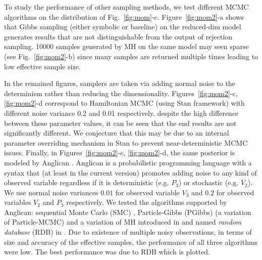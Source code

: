 \documentclass{article}
\begin{document}
To study the performance of other sampling methods, we test different MCMC algorithms on the distribution of Fig.~\ref{fig:mom}-c.
Figure~\ref{fig:mom2}-a shows that Gibbs sampling (either symbolic or baseline) on the {\color{green} reduced-dim} model generates results that are not distinguishable from the output of rejection sampling.
10000 samples generated by MH on the same model may seen  sparse (see Fig.~\ref{fig:mom2}-b) since many samples are returned multiple times leading to low effective sample size.

In the remained figures, samplers are taken via adding normal noise to the determinism rather than reducing the dimensionality.
Figures~\ref{fig:mom2}-c, \ref{fig:mom2}-d
correspond to Hamiltonian MCMC (using Stan framework) with different noise variance 0.2 and 0.01 respectively. despite the high difference between these parameter values, it can be seen that the end results are not significantly different. We conjecture that this may be due to
an internal parameter overriding mechanism in Stan to prevent near-deterministic MCMC issues. 
Finally, in Figures~\ref{fig:mom2}-c, \ref{fig:mom2}-d, the same posterior is modeled by Anglican \cite{wood2014new}.
Anglican is a probabilistic programming language with a syntax that (at least in the current version) promotes adding noise to any kind of observed variable regardless if it is deterministic 
(e.g. $P_3$) or stochastic (e.g. $V_2$). 
We use normal noise variances $0.01$ for observed variable $V_3$ and $0.2$ for observed variables $V_2$ and $P_3$ respectively.
We tested the algorithms supported by Anglican:
 sequential
Monte Carlo (SMC) \cite{wood2014new},
Particle-Gibbs (PGibbs) (a variation of Particle-MCMC\cite{andrieu2010particle}) 
and a variation of MH introduced in \cite{wingate2011lightweight} and named \emph{random database} (RDB) in \cite{wood2014new}.
Due to existence of multiple noisy observations, in terms of size and accuracy of the effective samples, the performance of all three algorithms were low. The best performance was due to RDB which is plotted. 
 
\end{document}

